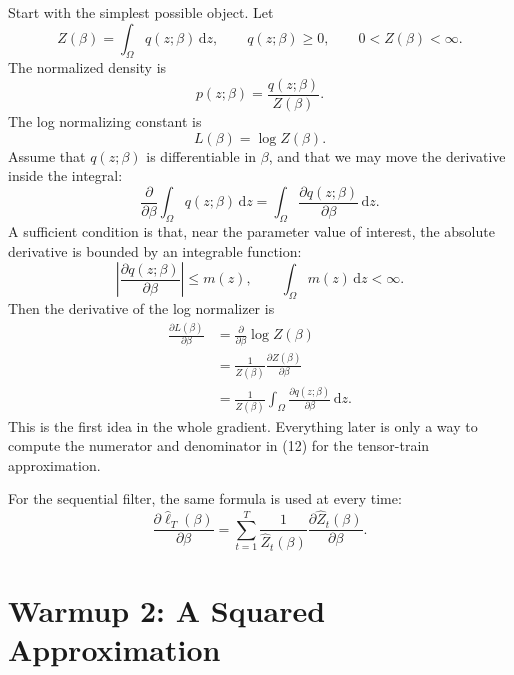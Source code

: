 \documentclass[11pt]{article}
\newcommand{\dd}{\,\mathrm d}
\newcommand{\widehatell}{\widehat\ell}
\begin{document}
Start with the simplest possible object.  Let
\[
    Z(\beta)=\int_\Omega q(z;\beta)\dd z,
    \qquad
    q(z;\beta)\ge 0,
    \qquad
    0<Z(\beta)<\infty.
    \tag{P19-7}
\]
The normalized density is
\[
    p(z;\beta)=\frac{q(z;\beta)}{Z(\beta)}.
    \tag{P19-8}
\]
The log normalizing constant is
\[
    L(\beta)=\log Z(\beta).
    \tag{P19-9}
\]
Assume that \(q(z;\beta)\) is differentiable in \(\beta\), and that we may move
the derivative inside the integral:
\[
    \frac{\partial}{\partial\beta}
    \int_\Omega q(z;\beta)\dd z
    =
    \int_\Omega
    \frac{\partial q(z;\beta)}{\partial\beta}\dd z.
    \tag{P19-10}
\]
A sufficient condition is that, near the parameter value of interest, the
absolute derivative is bounded by an integrable function:
\[
    \left|
    \frac{\partial q(z;\beta)}{\partial\beta}
    \right|
    \le m(z),
    \qquad
    \int_\Omega m(z)\dd z<\infty.
    \tag{P19-11}
\]
Then the derivative of the log normalizer is
\[
\begin{aligned}
    \frac{\partial L(\beta)}{\partial\beta}
    &=
    \frac{\partial}{\partial\beta}\log Z(\beta)\\
    &=
    \frac{1}{Z(\beta)}
    \frac{\partial Z(\beta)}{\partial\beta}\\
    &=
    \frac{1}{Z(\beta)}
    \int_\Omega
    \frac{\partial q(z;\beta)}{\partial\beta}\dd z.
\end{aligned}
\tag{P19-12}
\]
This is the first idea in the whole gradient.  Everything later is only a way
to compute the numerator and denominator in (12) for the tensor-train
approximation.

For the sequential filter, the same formula is used at every time:
\[
    \frac{\partial\widehatell_T(\beta)}{\partial\beta}
    =
    \sum_{t=1}^{T}
    \frac{1}{\widehat Z_t(\beta)}
    \frac{\partial\widehat Z_t(\beta)}{\partial\beta}.
    \tag{P19-13}
\]

\section{Warmup 2: A Squared Approximation}
\end{document}
